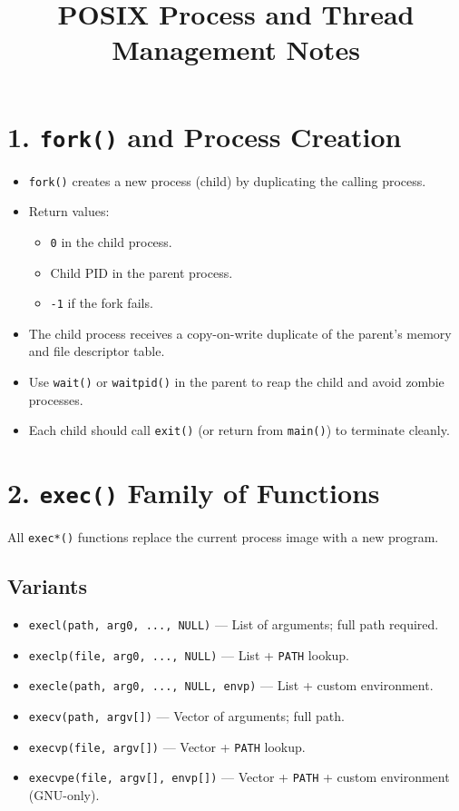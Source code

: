 \documentclass[12pt]{article}
\title{POSIX Process and Thread Management Notes}
\author{}
\date{}
\begin{document}
\maketitle

\section*{1. \texttt{fork()} and Process Creation}

\begin{itemize}[leftmargin=2em]
    \item \texttt{fork()} creates a new process (child) by duplicating the calling process.
    \item Return values:
    \begin{itemize}
        \item \texttt{0} in the child process.
        \item Child PID in the parent process.
        \item \texttt{-1} if the fork fails.
    \end{itemize}
    \item The child process receives a copy-on-write duplicate of the parent's memory and file descriptor table.
    \item Use \texttt{wait()} or \texttt{waitpid()} in the parent to reap the child and avoid zombie processes.
    \item Each child should call \texttt{exit()} (or return from \texttt{main()}) to terminate cleanly.
\end{itemize}

\section*{2. \texttt{exec()} Family of Functions}

All \texttt{exec*()} functions replace the current process image with a new program.

\subsection*{Variants}
\begin{itemize}[leftmargin=2em]
    \item \texttt{execl(path, arg0, ..., NULL)} — List of arguments; full path required.
    \item \texttt{execlp(file, arg0, ..., NULL)} — List + \texttt{PATH} lookup.
    \item \texttt{execle(path, arg0, ..., NULL, envp)} — List + custom environment.
    \item \texttt{execv(path, argv[])} — Vector of arguments; full path.
    \item \texttt{execvp(file, argv[])} — Vector + \texttt{PATH} lookup.
    \item \texttt{execvpe(file, argv[], envp[])} — Vector + \texttt{PATH} + custom environment (GNU-only).
\end{itemize}
\end{document}
